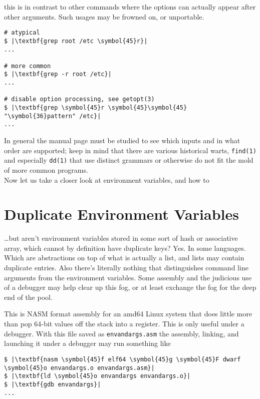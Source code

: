 \documentclass[10pt,a4paper]{article}
\begin{document}
this is in contrast to other commands where the options can actually
appear after other arguments. Such usages may be frowned on, or
unportable.

\begin{lstlisting}
# atypical
$ |\textbf{grep root /etc \symbol{45}r}|
...

# more common
$ |\textbf{grep -r root /etc}|
...

# disable option processing, see getopt(3)
$ |\textbf{grep \symbol{45}r \symbol{45}\symbol{45} "\symbol{36}pattern" /etc}|
...
\end{lstlisting}

In general the manual page must be studied to see which inputs and in
what order are supported; keep in mind that there are various historical
warts, \texttt{find(1)} and especially \texttt{dd(1)} that use distinct
grammars or otherwise do not fit the mold of more common programs. \\

Now let us take a closer look at environment variables, and how to

\section*{Duplicate Environment Variables}

\ldots but aren't environment variables stored in some sort of hash or
associative array, which cannot by definition have duplicate keys?
Yes. In some languages. Which are abstractions on top of what is
actually a list, and lists may contain duplicate entries. Also there's
literally nothing that distinguishes command line arguments from the
environment variables. Some assembly and the judicious use of a
debugger may help clear up this fog, or at least exchange the fog for
the deep end of the pool.



This is NASM format assembly for an amd64 Linux system that does little
more than pop 64-bit values off the stack into a register. This is only
useful under a debugger. With this file saved as \texttt{envandargs.asm}
the assembly, linking, and launching it under a debugger may run
something like

\begin{lstlisting}
$ |\textbf{nasm \symbol{45}f elf64 \symbol{45}g \symbol{45}F dwarf \symbol{45}o envandargs.o envandargs.asm}|
$ |\textbf{ld \symbol{45}o envandargs envandargs.o}|
$ |\textbf{gdb envandargs}|
...
\end{lstlisting}
\end{document}
